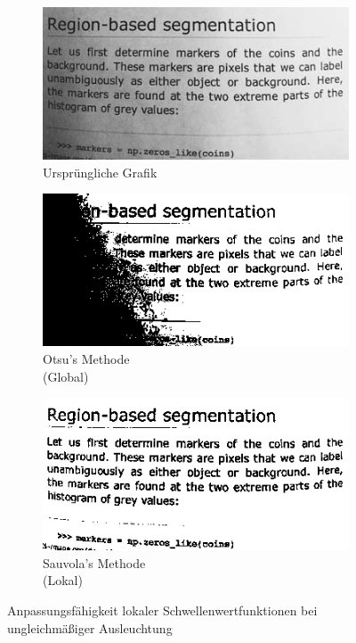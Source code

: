 \begin{figure}
    \begin{subfigure}[t]{0.3\textwidth}
        \centering
        \includegraphics[interpolate=true,width=\textwidth]{images/essentials_binarization_uneven_illumination}
        \caption{Ursprüngliche Grafik~\cite{scikit-image}}%
    \end{subfigure}
    \hfill
    \begin{subfigure}[t]{0.3\textwidth}
        \centering
        \includegraphics[interpolate=true,width=\textwidth]{images/essentials_binarization_uneven_illumination_otsu}
        \caption{Otsu's Methode\\(Global)}%
    \end{subfigure}
    \hfill
    \begin{subfigure}[t]{0.3\textwidth}
        \centering
        \includegraphics[interpolate=true,width=\textwidth]{images/essentials_binarization_uneven_illumination_sauvola}
        \caption{Sauvola's Methode\\(Lokal)}%
    \end{subfigure}
    \caption{Anpassungsfähigkeit lokaler Schwellenwertfunktionen bei ungleichmäßiger Ausleuchtung}%
    \label{fig:essentials_binarization_uneven_illumination}
\end{figure}

